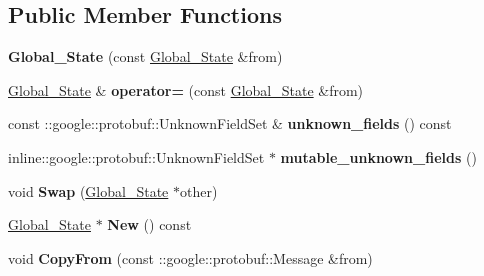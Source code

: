 \subsection*{Public Member Functions}
\begin{DoxyCompactItemize}
\item 
{\bfseries Global\+\_\+\+State} (const \hyperlink{classvss__state_1_1Global__State}{Global\+\_\+\+State} \&from)\hypertarget{classvss__state_1_1Global__State_a3a0a70c553656e9c3049308a9513e60c}{}\label{classvss__state_1_1Global__State_a3a0a70c553656e9c3049308a9513e60c}

\item 
\hyperlink{classvss__state_1_1Global__State}{Global\+\_\+\+State} \& {\bfseries operator=} (const \hyperlink{classvss__state_1_1Global__State}{Global\+\_\+\+State} \&from)\hypertarget{classvss__state_1_1Global__State_a01f51f37ae680992a1fd7b0aa3170af9}{}\label{classvss__state_1_1Global__State_a01f51f37ae680992a1fd7b0aa3170af9}

\item 
const \+::google\+::protobuf\+::\+Unknown\+Field\+Set \& {\bfseries unknown\+\_\+fields} () const \hypertarget{classvss__state_1_1Global__State_ad315f5c8ac8db0801d1f554b0f5220e9}{}\label{classvss__state_1_1Global__State_ad315f5c8ac8db0801d1f554b0f5220e9}

\item 
inline\+::google\+::protobuf\+::\+Unknown\+Field\+Set $\ast$ {\bfseries mutable\+\_\+unknown\+\_\+fields} ()\hypertarget{classvss__state_1_1Global__State_a4dbf780222435e650455d532b81dca44}{}\label{classvss__state_1_1Global__State_a4dbf780222435e650455d532b81dca44}

\item 
void {\bfseries Swap} (\hyperlink{classvss__state_1_1Global__State}{Global\+\_\+\+State} $\ast$other)\hypertarget{classvss__state_1_1Global__State_a2b83b57b8673e15692526e3c4ccccc94}{}\label{classvss__state_1_1Global__State_a2b83b57b8673e15692526e3c4ccccc94}

\item 
\hyperlink{classvss__state_1_1Global__State}{Global\+\_\+\+State} $\ast$ {\bfseries New} () const \hypertarget{classvss__state_1_1Global__State_a478df1a0909f344142b866def70f04f1}{}\label{classvss__state_1_1Global__State_a478df1a0909f344142b866def70f04f1}

\item 
void {\bfseries Copy\+From} (const \+::google\+::protobuf\+::\+Message \&from)\hypertarget{classvss__state_1_1Global__State_a5a57651faea985db08eafee9429407d0}{}\label{classvss__state_1_1Global__State_a5a57651faea985db08eafee9429407d0}


\end{DoxyCompactItemize}
